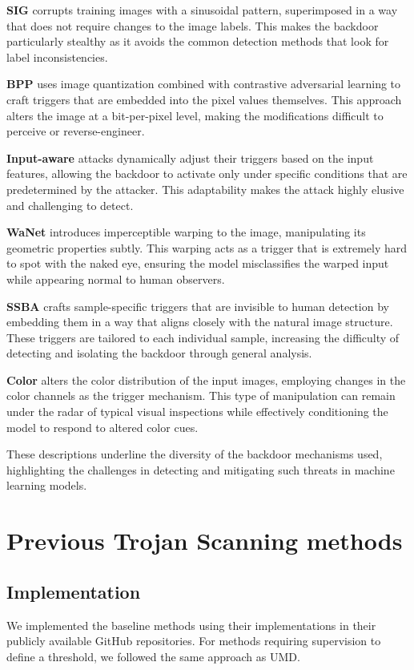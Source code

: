 \textbf{SIG} \cite{sig} corrupts training images with a sinusoidal pattern, superimposed in a way that does not require changes to the image labels. This makes the backdoor particularly stealthy as it avoids the common detection methods that look for label inconsistencies.

\textbf{BPP} \cite{bpp} uses image quantization combined with contrastive adversarial learning to craft triggers that are embedded into the pixel values themselves. This approach alters the image at a bit-per-pixel level, making the modifications difficult to perceive or reverse-engineer.

\textbf{Input-aware} attacks  \cite{inputaware} dynamically adjust their triggers based on the input features, allowing the backdoor to activate only under specific conditions that are predetermined by the attacker. This adaptability makes the attack highly elusive and challenging to detect.

\textbf{WaNet} \cite{wanet} introduces imperceptible warping to the image, manipulating its geometric properties subtly. This warping acts as a trigger that is extremely hard to spot with the naked eye, ensuring the model misclassifies the warped input while appearing normal to human observers.

\textbf{SSBA} \cite{ssba} crafts sample-specific triggers that are invisible to human detection by embedding them in a way that aligns closely with the natural image structure. These triggers are tailored to each individual sample, increasing the difficulty of detecting and isolating the backdoor through general analysis.

\textbf{Color} \cite{color} alters the color distribution of the input images, employing changes in the color channels as the trigger mechanism. This type of manipulation can remain under the radar of typical visual inspections while effectively conditioning the model to respond to altered color cues.

These descriptions underline the diversity of the backdoor mechanisms used, highlighting the challenges in detecting and mitigating such threats in machine learning models.




\section{Previous Trojan Scanning methods}

\subsection{Implementation}
\label{app:base_imp}
We implemented the baseline methods using their implementations in their publicly available GitHub repositories. For methods requiring supervision to define a threshold, we followed the same approach as UMD.


